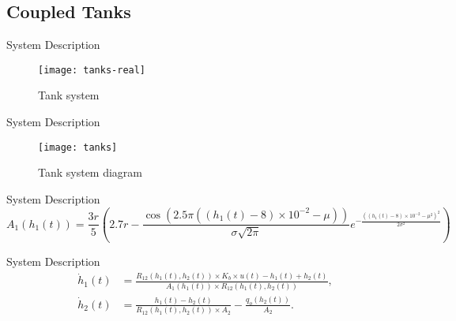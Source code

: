 \subsection{Coupled Tanks}%
\label{subsec:tanks}

\begin{slide}{System Description}
  \begin{figure}[ht!]
    \centering \captionsetup{justification=centering}
    \texttt{[image: tanks-real]}
    \caption{Tank system}%
    \label{fig:tanks-real}
  \end{figure}
\end{slide}

\begin{slide}{System Description}
  \begin{figure}[ht!]
    \centering \captionsetup{justification=centering}
    \texttt{[image: tanks]}
    \caption{Tank system diagram}%
    \label{fig:tanks}
  \end{figure}
\end{slide}

\begin{slide}{System Description}
  \begin{equation}
    \label{eq:t1-area}
    A_{1}(h_{1}(t)) = \frac{3r}{5} \left(
    2.7r - \frac{\cos(2.5\pi{}((h_{1}(t)-8)\times{}10^{-2}-\mu))}{\sigma{}\sqrt{2\pi}}
    e^{-\frac{((h_{1}(t)-8)\times{}10^{-2}-\mu^{2})^{2}}{2\sigma^{2}}}
    \right)
  \end{equation}
\end{slide}

\begin{slide}{System Description}
  \begin{equation}
    \label{eq:formula-height-variation}
    \begin{aligned}
      \dot{h}_1(t) & = \frac{R_{12}(h_{1}(t),h_{2}(t))\times{}K_{b}\times{}u(t)-h_{1}(t)+h_{2}(t)}
      {A_{1}(h_{1}(t))\times{}R_{12}(h_{1}(t),h_{2}(t))},                                                                \\
      \dot{h}_2(t) & = \frac{h_{1}(t)-h_{2}(t)}{R_{12}(h_{1}(t),h_{2}(t))\times{}A_{2}} - \frac{q_{o}(h_{2}(t))}{A_{2}}.
    \end{aligned}
  \end{equation}
\end{slide}

